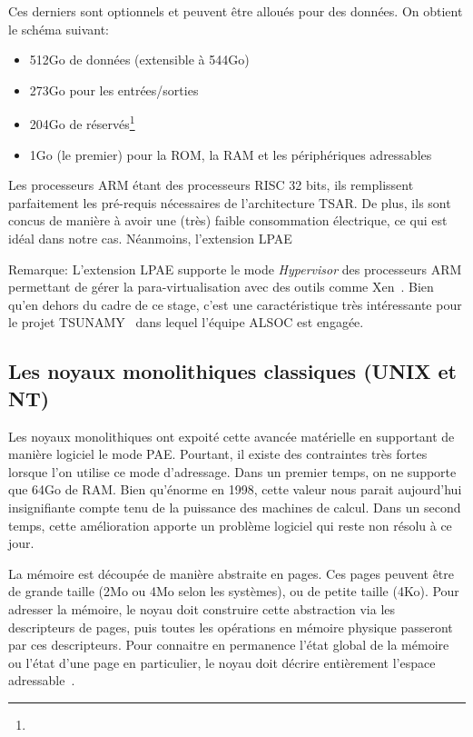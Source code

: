     Ces derniers sont optionnels et peuvent être alloués pour des données. On
    obtient le schéma suivant:

    \begin{itemize}
      \item 512Go de données (extensible à 544Go)
      \item 273Go pour les entrées/sorties
      \item 204Go de réservés\footnote{}
      \item 1Go (le premier) pour la ROM, la RAM et les périphériques
        adressables
    \end{itemize}

    Les processeurs ARM étant des processeurs RISC 32 bits, ils remplissent
    parfaitement les pré-requis nécessaires de l'architecture TSAR. De plus, ils
    sont concus de manière à avoir une (très) faible consommation électrique, ce
    qui est idéal dans notre cas. Néanmoins, l'extension LPAE

    \begin{paragraph}{Remarque:}
      L'extension LPAE supporte le mode \textit{Hypervisor} des processeurs ARM
      permettant de gérer la para-virtualisation avec des outils comme
      Xen~\cite{barham2003xen}. Bien qu'en dehors du cadre de ce stage, c'est
      une caractéristique très intéressante pour le projet
      TSUNAMY~\cite{tsunamy2013web} dans lequel l'équipe ALSOC est engagée.
    \end{paragraph}


    \subsection{Les noyaux monolithiques classiques (UNIX et NT)}

      Les noyaux monolithiques ont expoité cette avancée matérielle en
      supportant de manière logiciel le mode PAE. Pourtant, il existe des
      contraintes très fortes lorsque l'on utilise ce mode d'adressage. Dans un
      premier temps, on ne supporte que 64Go de RAM. Bien qu'énorme en 1998,
      cette valeur nous parait aujourd'hui insignifiante compte tenu de la
      puissance des machines de calcul.  Dans un second temps, cette
      amélioration apporte un problème logiciel qui reste non résolu à ce
      jour.\newline

      La mémoire est découpée de manière abstraite en pages. Ces pages peuvent
      être de grande taille (2Mo ou 4Mo selon les systèmes), ou de petite taille
      (4Ko). Pour adresser la mémoire, le noyau doit construire cette
      abstraction via les descripteurs de pages, puis toutes les opérations en
      mémoire physique passeront par ces descripteurs. Pour connaitre en
      permanence l'état global de la mémoire ou l'état d'une page en
      particulier, le noyau doit décrire entièrement l'espace
      adressable~\citep{cranor1999uvm, gorman2004understanding,
        russinovich2012windows, dillon2000design, steldt2009memory,
        steldtXXXXopenbsd}.


